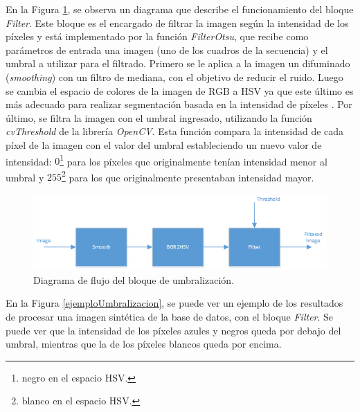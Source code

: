 En la Figura \ref{diagramaumbralizacion}, se observa un diagrama que describe el funcionamiento del bloque \emph{Filter}. Este bloque es el encargado de filtrar la imagen según la intensidad de los píxeles y está implementado por la función \emph{FilterOtsu}, que recibe como parámetros de entrada una imagen (uno de los cuadros de la secuencia) y el umbral a utilizar para el filtrado. Primero se le aplica a la imagen un difuminado (\textit{smoothing}) con un filtro de mediana, con el objetivo de reducir el ruido. Luego se cambia el espacio de colores de la imagen de RGB a HSV ya que este último es más adecuado para realizar segmentación basada en la intensidad de píxeles \cite{HSV}. Por último, se filtra la imagen con el umbral ingresado, utilizando la función \emph{cvThreshold} de la librería \emph{OpenCV}. Esta función compara la intensidad de cada píxel de la imagen con el valor del umbral estableciendo un nuevo valor de intensidad: $0$\footnote{negro en el espacio HSV.} para los píxeles que originalmente tenían intensidad menor al umbral y $255$\footnote{blanco en el espacio HSV.} para los que originalmente presentaban intensidad mayor.

\begin{figure}[ht!]
\begin{center}
\includegraphics[scale=0.7]{img/diagrama_umbralizacion.png}
\end{center}
\caption{Diagrama de flujo del bloque de umbralización.}
\label{diagramaumbralizacion}
\end{figure}

En la Figura \ref{ejemploUmbralizacion}, se puede ver un ejemplo de los resultados de procesar una imagen sintética de la base de datos, con el bloque \emph{Filter}. Se puede ver que la intensidad de los píxeles azules y negros queda por debajo del umbral, mientras que la de los píxeles blancos queda por encima. %

